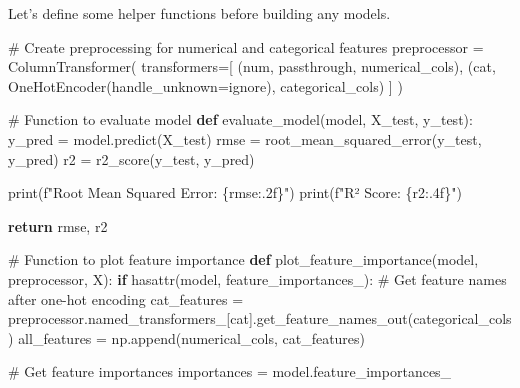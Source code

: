 \documentclass[
  letterpaper,
  DIV=11,
  numbers=noendperiod]{scrreprt}
\newenvironment{Shaded}{\begin{snugshade}}{\end{snugshade}}
\newcommand{\BuiltInTok}[1]{\textcolor[rgb]{0.00,0.23,0.31}{#1}}
\newcommand{\CommentTok}[1]{\textcolor[rgb]{0.37,0.37,0.37}{#1}}
\newcommand{\ControlFlowTok}[1]{\textcolor[rgb]{0.00,0.23,0.31}{\textbf{#1}}}
\newcommand{\KeywordTok}[1]{\textcolor[rgb]{0.00,0.23,0.31}{\textbf{#1}}}
\newcommand{\NormalTok}[1]{\textcolor[rgb]{0.00,0.23,0.31}{#1}}
\newcommand{\OperatorTok}[1]{\textcolor[rgb]{0.37,0.37,0.37}{#1}}
\newcommand{\SpecialCharTok}[1]{\textcolor[rgb]{0.37,0.37,0.37}{#1}}
\newcommand{\SpecialStringTok}[1]{\textcolor[rgb]{0.13,0.47,0.30}{#1}}
\newcommand{\StringTok}[1]{\textcolor[rgb]{0.13,0.47,0.30}{#1}}
\begin{document}
Let's define some helper functions before building any models.

\begin{Shaded}
\begin{Highlighting}[]
\CommentTok{\# Create preprocessing for numerical and categorical features}
\NormalTok{preprocessor }\OperatorTok{=}\NormalTok{ ColumnTransformer(}
\NormalTok{    transformers}\OperatorTok{=}\NormalTok{[}
\NormalTok{        (}\StringTok{\textquotesingle{}num\textquotesingle{}}\NormalTok{, }\StringTok{\textquotesingle{}passthrough\textquotesingle{}}\NormalTok{, numerical\_cols),}
\NormalTok{        (}\StringTok{\textquotesingle{}cat\textquotesingle{}}\NormalTok{, OneHotEncoder(handle\_unknown}\OperatorTok{=}\StringTok{\textquotesingle{}ignore\textquotesingle{}}\NormalTok{), categorical\_cols)}
\NormalTok{    ]}
\NormalTok{)}

\CommentTok{\# Function to evaluate model}
\KeywordTok{def}\NormalTok{ evaluate\_model(model, X\_test, y\_test):}
\NormalTok{    y\_pred }\OperatorTok{=}\NormalTok{ model.predict(X\_test)}
\NormalTok{    rmse }\OperatorTok{=}\NormalTok{ root\_mean\_squared\_error(y\_test, y\_pred)}
\NormalTok{    r2 }\OperatorTok{=}\NormalTok{ r2\_score(y\_test, y\_pred)}
    
    \BuiltInTok{print}\NormalTok{(}\SpecialStringTok{f"Root Mean Squared Error: }\SpecialCharTok{\{}\NormalTok{rmse}\SpecialCharTok{:.2f\}}\SpecialStringTok{"}\NormalTok{)}
    \BuiltInTok{print}\NormalTok{(}\SpecialStringTok{f"R² Score: }\SpecialCharTok{\{}\NormalTok{r2}\SpecialCharTok{:.4f\}}\SpecialStringTok{"}\NormalTok{)}
    
    \ControlFlowTok{return}\NormalTok{ rmse,  r2}

\CommentTok{\# Function to plot feature importance}
\KeywordTok{def}\NormalTok{ plot\_feature\_importance(model, preprocessor, X):}
    \ControlFlowTok{if} \BuiltInTok{hasattr}\NormalTok{(model, }\StringTok{\textquotesingle{}feature\_importances\_\textquotesingle{}}\NormalTok{):}
        \CommentTok{\# Get feature names after one{-}hot encoding}
\NormalTok{        cat\_features }\OperatorTok{=}\NormalTok{ preprocessor.named\_transformers\_[}\StringTok{\textquotesingle{}cat\textquotesingle{}}\NormalTok{].get\_feature\_names\_out(categorical\_cols)}
\NormalTok{        all\_features }\OperatorTok{=}\NormalTok{ np.append(numerical\_cols, cat\_features)}
        
        \CommentTok{\# Get feature importances}
\NormalTok{        importances }\OperatorTok{=}\NormalTok{ model.feature\_importances\_}
        

\end{Highlighting}
\end{Shaded}
\end{document}
